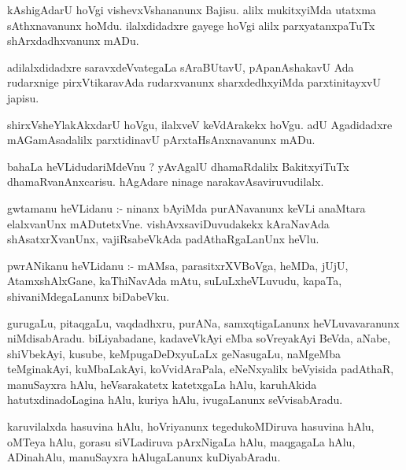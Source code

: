 \documentclass{article}
\begin{document}
\begin{mn}
kAshigAdarU  hoVgi  vishevxVshananunx  Bajisu.  alilx  mukitxyiMda  utatxma  sAthxnavanunx  hoMdu.  ilalxdidadxre  
gayege  hoVgi  alilx  parxyatanxpaTuTx  shArxdadhxvanunx  mADu.
\end{mn}

\begin{mn}
adilalxdidadxre  saravxdeVvategaLa  sAraBUtavU,  pApanAshakavU  Ada  rudarxnige  pirxVtikaravAda  rudarxvanunx  
sharxdedhxyiMda  parxtinitayxvU  japisu.
\end{mn}

\begin{mn}
shirxVsheYlakAkxdarU  hoVgu,  ilalxveV  keVdArakekx  hoVgu.  adU  Agadidadxre  mAGamAsadalilx  parxtidinavU  
pArxtaHsAnxnavanunx  mADu.
\end{mn}

\begin{mn}
bahaLa  heVLidudariMdeVnu ?  yAvAgalU  dhamaRdalilx  BakitxyiTuTx  dhamaRvanAnxcarisu.  hAgAdare  
ninage  narakavAsaviruvudilalx.
\end{mn}

\begin{mn}
gwtamanu  heVLidanu :- ninanx  bAyiMda  purANavanunx  keVLi  anaMtara  elalxvanUnx  mADutetxVne.  
vishAvxsaviDuvudakekx  kAraNavAda  shAsatxrXvanUnx,  vajiRsabeVkAda  padAthaRgaLanUnx  heVlu.
\end{mn}

\begin{mn}
pwrANikanu  heVLidanu :- mAMsa,  parasitxrXVBoVga,  heMDa,  jUjU,  AtamxshAlxGane,  kaThiNavAda  mAtu,  
suLuLxheVLuvudu,  kapaTa,  shivaniMdegaLanunx  biDabeVku.
\end{mn}

\begin{mn}
gurugaLu,  pitaqgaLu,  vaqdadhxru,  purANa,  samxqtigaLanunx  heVLuvavaranunx  niMdisabAradu.  biLiyabadane,  
kadaveVkAyi  eMba  soVreyakAyi  BeVda,  aNabe,  shiVbekAyi,  kusube,  keMpugaDeDxyuLaLx  geNasugaLu,  naMgeMba  
teMginakAyi,  kuMbaLakAyi,  koVvidAraPala,  eNeNxyalilx  beVyisida  padAthaR,  manuSayxra  hAlu,  heVsarakatetx  
katetxgaLa  hAlu,  karuhAkida  hatutxdinadoLagina  hAlu,  kuriya  hAlu,  ivugaLanunx  seVvisabAradu.
\end{mn}

\begin{mn}
karuvilalxda  hasuvina  hAlu,  hoVriyanunx  tegedukoMDiruva  hasuvina  hAlu,  oMTeya  hAlu,  gorasu  siVLadiruva  
pArxNigaLa  hAlu,  maqgagaLa  hAlu,  ADinahAlu,  manuSayxra  hAlugaLanunx  kuDiyabAradu.
\end{mn}
\end{document}
